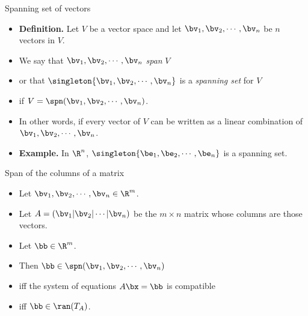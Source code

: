 \documentclass{beamer}
\begin{document}
\begin{frame}{Spanning set of vectors}

\begin{itemize}
\item \textbf{Definition.} Let $V$ be a vector space and let $\bv_1,\bv_2,\cdots,\bv_n$ be $n$ vectors in $V$.
\item We say that $\bv_1,\bv_2,\cdots,\bv_n$ \emph{span} $V$
\item or that $\singleton{\bv_1,\bv_2,\cdots,\bv_n}$ is a \emph{spanning set} for $V$
\item if $V=\spn(\bv_1,\bv_2,\cdots,\bv_n)$.
\item In other words, if every vector of $V$ can be written as a linear combination of
 $\bv_1,\bv_2,\cdots,\bv_n$.
 \item \textbf{Example.} In $\R^n$, $\singleton{\be_1,\be_2,\cdots,\be_n}$ is a
 spanning set.
\end{itemize}

\end{frame}


\begin{frame}{Span of the columns of a matrix}

\begin{itemize}
\item Let $\bv_1,\bv_2,\cdots,\bv_n \in \R^m$.
\item Let $A =\left( \bv_1 \vert \bv_2 \vert \cdots \vert \bv_n \right)$
be the $m\times n$ matrix whose columns are those vectors.
\item Let $\bb\in\R^m$.
\item Then $\bb\in\spn(\bv_1,\bv_2,\cdots,\bv_n)$
\item iff the system of equations $A\bx=\bb$ is compatible
\item iff $\bb\in\ran(T_A)$.
\end{itemize}

\end{frame}

\end{document}
